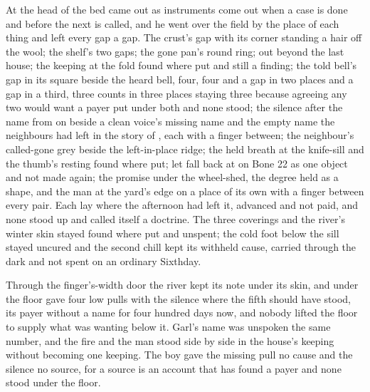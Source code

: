 At the head of the bed  came out as instruments come out when a case is done and before the next is called, and he went over the field by the place of each thing and left every gap a gap. The crust's gap with its corner standing a hair off the wool; the shelf's two gaps; the gone pan's round ring;  out beyond the last house; the keeping at the fold found where put and still a finding; the told bell's gap in its square beside the heard bell, four, four and a gap in two places and a gap in a third, three counts in three places staying three because agreeing any two would want a payer put under both and none stood; the silence after the name from  on  beside a clean voice's missing name and the empty name the neighbours had left in the story of , each with a finger between; the neighbour's called-gone grey beside the left-in-place ridge; the held breath at the knife-sill and the thumb's resting found where put;  let fall back at  on Bone 22 as one object and not made again; the promise under the wheel-shed, the degree held as a shape, and the man at the yard's edge on a place of its own with a finger between every pair. Each lay where the afternoon had left it, advanced and not paid, and none stood up and called itself a doctrine. The three coverings and the river's winter skin stayed found where put and unspent; the cold foot below the sill stayed uncured and the second chill kept its withheld cause, carried through the dark and not spent on an ordinary Sixthday.

Through the finger's-width door the river kept its note under its skin, and under the floor  gave four low pulls with the silence where the fifth should have stood, its payer without a name for four hundred days now, and nobody lifted the floor to supply what was wanting below it. Garl's name was unspoken the same number, and the fire and the man stood side by side in the house's keeping without becoming one keeping. The boy gave the missing pull no cause and the silence no source, for a source is an account that has found a payer and none stood under the floor.

